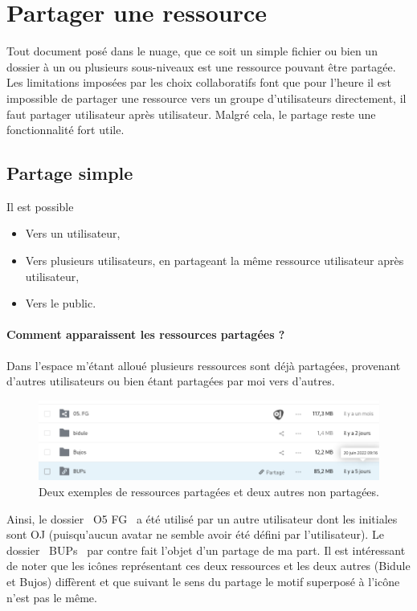 \section{Partager une ressource}
Tout document posé dans le nuage, que ce soit un simple fichier ou bien un dossier à un ou plusieurs sous-niveaux est une ressource pouvant être partagée. 
Les limitations imposées par les choix collaboratifs font que pour l'heure il est impossible de partager une ressource vers un groupe d'utilisateurs directement, il faut partager utilisateur après utilisateur. 
Malgré cela, le partage reste une fonctionnalité fort utile.

\subsection{Partage simple}
Il est possible
\begin{itemize}
    \item Vers un utilisateur,
    \item Vers plusieurs utilisateurs, en partageant la même ressource utilisateur après utilisateur,
    \item Vers le public.
\end{itemize}

\paragraph{Comment apparaissent les ressources partagées ?}
Dans l'espace m'étant alloué plusieurs ressources sont déjà partagées, provenant d'autres utilisateurs ou bien étant partagées par moi vers d'autres.
\begin{figure}
	\centering
	\includegraphics{./Captures/nuage.partager.icones.png}
	\caption{Deux exemples de ressources partagées et deux autres non partagées.}
\end{figure}
Ainsi, le dossier \og~O5 FG~\fg{} a été utilisé par un autre utilisateur dont les initiales sont OJ (puisqu'aucun avatar ne semble avoir été défini par l'utilisateur). 
Le dossier \og~BUPs~\fg{} par contre fait l'objet d'un partage de ma part. 
Il est intéressant de noter que les icônes représentant ces deux ressources et les deux autres (Bidule et Bujos) diffèrent et que suivant le sens du partage le motif superposé à l'icône n'est pas le même. 

